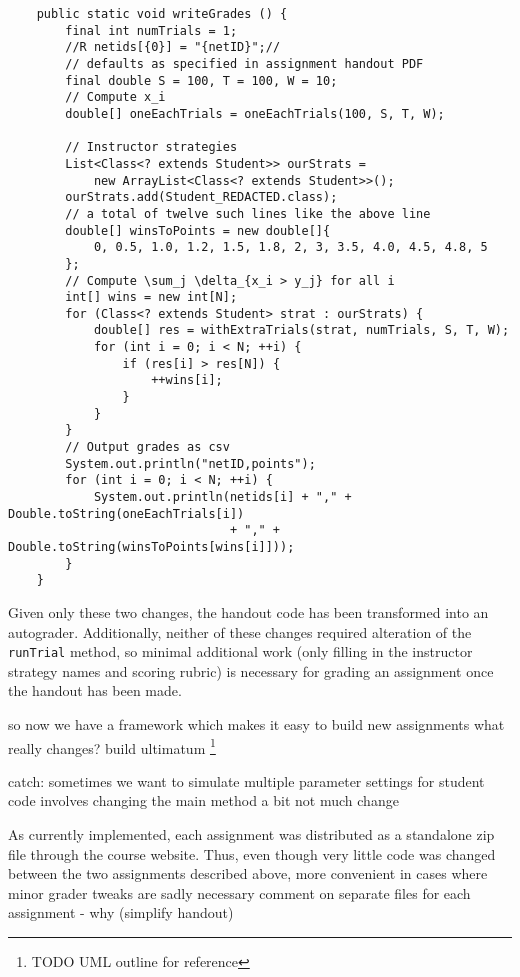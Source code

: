 \documentclass[pageno]{jpaper}
\begin{document}
\begin{verbatim}
    public static void writeGrades () {
        final int numTrials = 1;
        //R netids[{0}] = "{netID}";//
        // defaults as specified in assignment handout PDF
        final double S = 100, T = 100, W = 10;
        // Compute x_i
        double[] oneEachTrials = oneEachTrials(100, S, T, W);

        // Instructor strategies
        List<Class<? extends Student>> ourStrats =
            new ArrayList<Class<? extends Student>>();
        ourStrats.add(Student_REDACTED.class);
        // a total of twelve such lines like the above line
        double[] winsToPoints = new double[]{
            0, 0.5, 1.0, 1.2, 1.5, 1.8, 2, 3, 3.5, 4.0, 4.5, 4.8, 5
        };
        // Compute \sum_j \delta_{x_i > y_j} for all i
        int[] wins = new int[N];
        for (Class<? extends Student> strat : ourStrats) {
            double[] res = withExtraTrials(strat, numTrials, S, T, W);
            for (int i = 0; i < N; ++i) {
                if (res[i] > res[N]) {
                    ++wins[i];
                }
            }
        }
        // Output grades as csv
        System.out.println("netID,points");
        for (int i = 0; i < N; ++i) {
            System.out.println(netids[i] + "," + Double.toString(oneEachTrials[i])
                               + "," + Double.toString(winsToPoints[wins[i]]));
        }
    }
\end{verbatim}
Given only these two changes, the handout code has been transformed into an autograder.
Additionally, neither of these changes required alteration of the \texttt{runTrial} method, so minimal additional work (only filling in the instructor strategy names and scoring rubric) is necessary for grading an assignment once the handout has been made.

so now we have a framework which makes it easy to build new assignments
what really changes?
build ultimatum
\footnote{TODO UML outline for reference}

catch: sometimes we want to simulate multiple parameter settings for student code
involves changing the main method a bit
not much change

As currently implemented, each assignment was distributed as a standalone zip file through the course website.
Thus, even though very little code was changed between the two assignments described above,
more convenient in cases where minor grader tweaks are sadly necessary
comment on separate files for each assignment - why (simplify handout)
\end{document}
